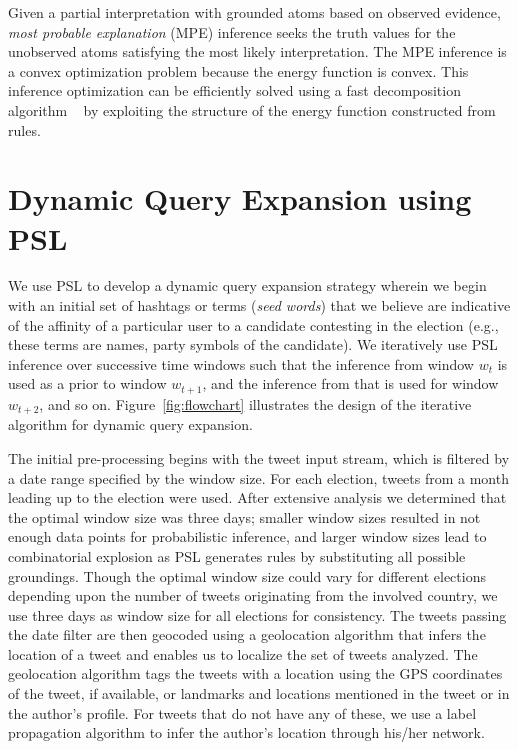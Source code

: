 Given a partial interpretation with grounded atoms based on observed evidence, \emph{most probable explanation} (MPE) inference seeks the truth values for the unobserved atoms satisfying the most likely interpretation. 
The MPE inference is a convex optimization problem because the energy function is convex. 
This inference optimization can be efficiently solved using a fast decomposition algorithm ~\cite{bach2012scaling,bach2013hinge} by exploiting the structure of the energy function constructed from rules.
\section{Dynamic Query Expansion using PSL}
We use PSL to develop a dynamic query expansion strategy wherein we begin with an
initial set of hashtags or terms (\emph{seed words})
that we believe are indicative of the affinity of a
particular user to a candidate contesting in the election (e.g., these terms are names,
party symbols of the candidate).
We iteratively use PSL inference over successive time windows such that the inference 
from window $w_t$ is used as a prior to window $w_{t+1}$, and the inference from 
that is used for window $w_{t+2}$, and so on.
Figure~\ref{fig:flowchart} illustrates the design of the iterative algorithm for dynamic query expansion.

The initial pre-processing begins with the tweet input stream, which is filtered by a
date range specified by the window size. 
For each election, tweets from a month leading up to the election were used.
After extensive analysis we determined that the optimal window size was three days;
smaller window sizes resulted in not enough data points for probabilistic inference, and
larger window sizes lead to combinatorial explosion as PSL generates rules by
substituting all possible groundings.
Though the optimal window size could vary for different elections depending upon the number of tweets originating from the involved country, we use three days as window size for all elections 
for consistency. 
The tweets passing the date filter are then geocoded using a geolocation algorithm that infers 
the location of a tweet and enables us to localize the set of tweets analyzed.
The geolocation algorithm tags the tweets with a location using the
GPS coordinates of the tweet, if available, or landmarks and locations mentioned in the tweet 
or in the author's profile. 
For tweets that do not have any of these, we use 
a label propagation algorithm to infer the author's location through his/her network.

